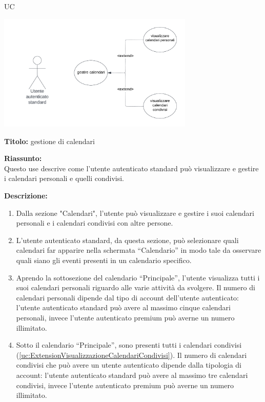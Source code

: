 \begin{listaPersonale}{UC}
    \newpage

    \begin{center}
        \includegraphics[width=0.7\textwidth]{img/Diagrammi/UseCases/CondivisioneCalendario.png}
    \end{center}

    \textbf{Titolo:} gestione di calendari

    \textbf{Riassunto:} \\
    Questo use descrive come l'utente autenticato standard può visualizzare e gestire i calendari personali e quelli condivisi.

    \textbf{Descrizione:}
    \begin{enumerate}
        \item Dalla sezione "Calendari", l'utente può visualizzare e gestire i suoi calendari personali e i calendari condivisi con altre persone.
        \item L'utente autenticato standard, da questa sezione, può selezionare quali calendari far apparire nella schermata “Calendario” in modo tale da osservare quali siano gli eventi presenti in un calendario specifico.
        \item Aprendo la sottosezione del calendario “Principale”, l'utente visualizza tutti i suoi calendari personali riguardo alle varie attività da svolgere. Il numero di calendari personali dipende dal tipo di account dell'utente autenticato: l'utente autenticato standard può avere al massimo cinque calendari personali, invece l'utente autenticato premium può averne un numero illimitato.
        \item Sotto il calendario “Principale”, sono presenti tutti i calendari condivisi (\ref{uc:ExtensionVisualizzazioneCalendariCondivisi}). Il numero di calendari condivisi che può avere un utente autenticato dipende dalla tipologia di account: l'utente autenticato standard può avere al massimo tre calendari condivisi, invece l'utente autenticato premium può averne un numero illimitato.
    \end{enumerate}



\end{listaPersonale}
